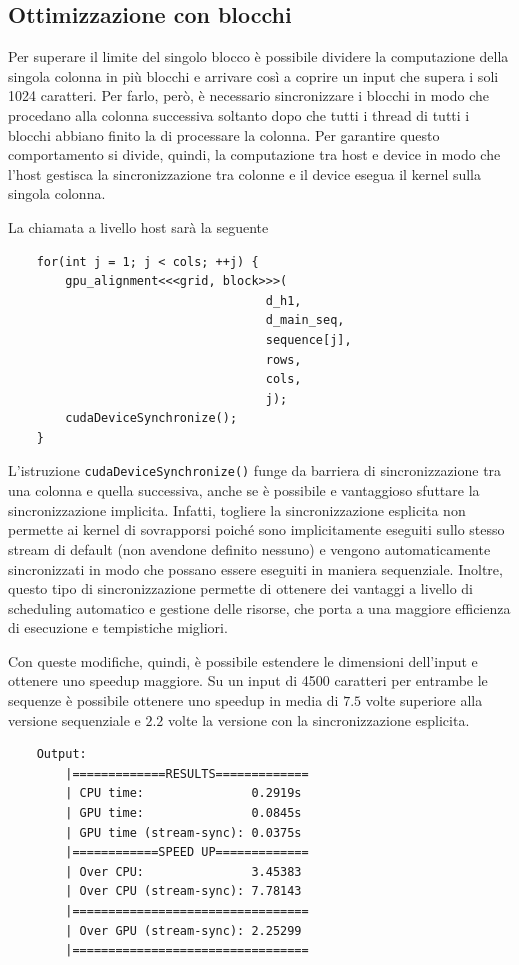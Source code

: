 \documentclass[a4paper,12pt]{article}
\begin{document}
\subsection{Ottimizzazione con blocchi}
Per superare il limite del singolo blocco è possibile dividere la computazione della singola colonna in più blocchi e arrivare così a coprire un input che supera i soli 1024 caratteri. Per farlo, però, è necessario sincronizzare i blocchi in modo che procedano alla colonna successiva soltanto dopo che tutti i thread di tutti i blocchi abbiano finito la di processare la colonna.
Per garantire questo comportamento si divide, quindi, la computazione tra host e device in modo che l'host gestisca la sincronizzazione tra colonne e il device esegua il kernel sulla singola colonna.

La chiamata a livello host sarà la seguente
\begin{lstlisting}
    for(int j = 1; j < cols; ++j) {
        gpu_alignment<<<grid, block>>>(
                                    d_h1,
                                    d_main_seq,
                                    sequence[j],
                                    rows,
                                    cols,
                                    j);
        cudaDeviceSynchronize();
    }
\end{lstlisting}

L'istruzione \texttt{cudaDeviceSynchronize()} funge da barriera di sincronizzazione tra una colonna e quella successiva, anche se è possibile e vantaggioso sfuttare la sincronizzazione implicita.
Infatti, togliere la sincronizzazione esplicita non permette ai kernel di sovrapporsi poiché sono implicitamente eseguiti sullo stesso stream di default (non avendone definito nessuno) e vengono automaticamente sincronizzati in modo che possano essere eseguiti in maniera sequenziale. Inoltre, questo tipo di sincronizzazione permette di ottenere dei vantaggi a livello di scheduling automatico e gestione delle risorse, che porta a una maggiore efficienza di esecuzione e tempistiche migliori.

Con queste modifiche, quindi, è possibile estendere le dimensioni dell'input e ottenere uno speedup maggiore.
Su un input di 4500 caratteri per entrambe le sequenze è possibile ottenere uno speedup in media di $7.5$ volte superiore alla versione sequenziale e $2.2$ volte la versione con la sincronizzazione esplicita.
\begin{lstlisting}
    Output:
        |=============RESULTS=============
        | CPU time:               0.2919s
        | GPU time:               0.0845s
        | GPU time (stream-sync): 0.0375s
        |============SPEED UP=============
        | Over CPU:               3.45383
        | Over CPU (stream-sync): 7.78143
        |=================================
        | Over GPU (stream-sync): 2.25299
        |=================================
\end{lstlisting}
\end{document}

